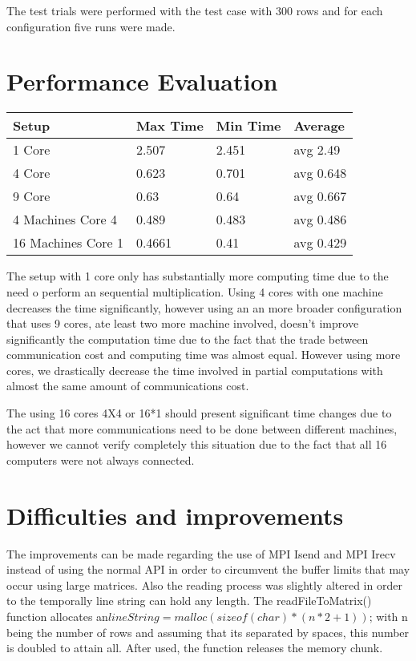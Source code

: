 \documentclass[10pt,a4paper,final]{report}
\begin{document}
The test trials were performed with the test case with 300 rows and for each configuration five runs were made.

\section{Performance Evaluation}

\begin{center}
    \begin{tabular}{| l | l | l | l |}
    \hline
    Setup & Max Time & Min Time & Average \\ \hline
    1 Core & 2.507 & 2.451 &  avg 2.49\\ \hline
    4 Core & 0.623 & 0.701 &  avg 0.648 \\ \hline
    9 Core & 0.63 & 0.64 & avg 0.667 \\ \hline
	4 Machines Core 4 & 0.489 & 0.483 & avg 0.486 \\ \hline
    16 Machines Core 1 & 0.4661 & 0.41 & avg 0.429 \\ \hline
    
    \end{tabular}
\end{center}

The setup with 1 core only has substantially more computing time due to the need o perform an sequential multiplication.
Using 4 cores with one machine decreases the time significantly, however using an an more broader configuration that uses 9 cores, ate least two more machine involved, doesn't improve significantly the computation time due to the fact that the trade between communication cost and computing time was almost equal. However using more cores, we drastically decrease the time involved in partial computations with almost the same amount of communications cost.

The using 16 cores 4X4 or 16*1 should present significant time changes due to the act that more communications need to be done between different machines, however we cannot verify completely this situation due to the fact that all 16 computers were not always connected. 

\section{Difficulties and improvements}
The improvements can be made regarding the use of MPI Isend and MPI Irecv instead of using the normal API in order to circumvent the buffer limits that may occur using large matrices. Also the reading process was slightly altered in order to the temporally line string can hold any length. The readFileToMatrix() function allocates an$ lineString = malloc( sizeof(char) * ( n*2 + 1 ) )$; with n being the number of rows and assuming that its separated by spaces, this number is doubled to attain all. After used, the function releases the memory chunk.
\end{document}
